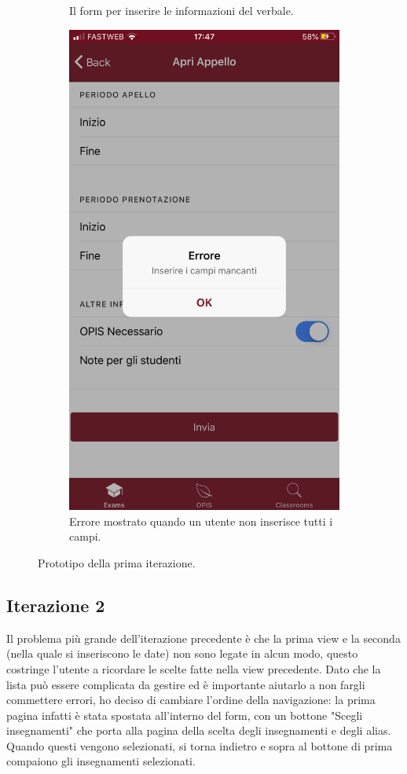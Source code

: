 \documentclass[Lau, oneside, noexaminfo]{sapthesis}%
\begin{document}
\begin{figure}[H]
\begin{subfigure}{0.6\textwidth}
		\caption{Il form per inserire le informazioni del verbale.}
		\label{fig:sub-fourth}
	  \end{subfigure}
	  \begin{subfigure}{0.6\textwidth}
		\centering
		\includegraphics[width=0.5\linewidth]{ui-iterations/i/error-form}  
		\caption{Errore mostrato quando un utente non inserisce tutti i campi.}
		\label{fig:sub-fifth}
	  \end{subfigure}
	  
	\caption{Prototipo della prima iterazione.}
	\label{fig:it-1}
\end{figure}	

\subsection{Iterazione 2}
Il problema più grande dell'iterazione precedente è che la prima view e la seconda (nella quale si inseriscono le date) non sono legate in alcun modo, questo costringe l'utente a ricordare le scelte fatte nella view precedente. Dato che la lista può essere complicata da gestire ed è importante aiutarlo a non fargli commettere errori, ho deciso di cambiare l'ordine della navigazione: la prima pagina infatti è stata spostata all'interno del form, con un bottone "Scegli insegnamenti" che porta alla pagina della scelta degli insegnamenti e degli alias. Quando questi vengono selezionati, si torna indietro e sopra al bottone di prima compaiono gli insegnamenti selezionati.
\end{document}
